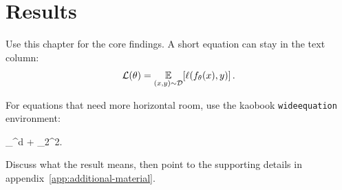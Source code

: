 
\chapter{Results}
\label{ch:results}

Use this chapter for the core findings. A short equation can stay in the text
column:
\[
	\calL(\theta) = \E[(x,y) \sim \calD]{\ell(f_\theta(x), y)}.
\]

For equations that need more horizontal room, use the kaobook
\texttt{wideequation} environment:
\begin{wideequation}
	\Argmin_{\theta \in \R^d}
	+ \lambda \lVert \theta \rVert_2^2.
\end{wideequation}

Discuss what the result means, then point to the supporting details in
appendix~\ref{app:additional-material}.

